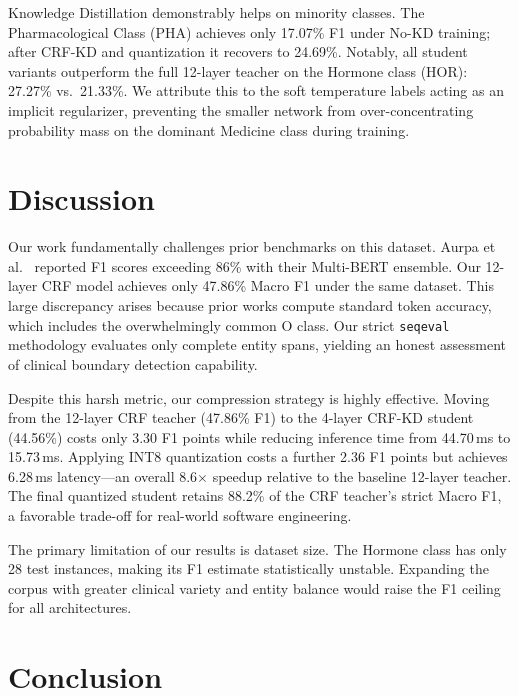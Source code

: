 \documentclass[conference]{IEEEtran}
\begin{document}
Knowledge Distillation demonstrably helps on minority classes. The Pharmacological Class (PHA) achieves only 17.07\% F1 under No-KD training; after CRF-KD and quantization it recovers to 24.69\%. Notably, all student variants outperform the full 12-layer teacher on the Hormone class (HOR): 27.27\% vs.\ 21.33\%. We attribute this to the soft temperature labels acting as an implicit regularizer, preventing the smaller network from over-concentrating probability mass on the dominant Medicine class during training.

\section{Discussion}

Our work fundamentally challenges prior benchmarks on this dataset. Aurpa et al.~\cite{b5} reported F1 scores exceeding 86\% with their Multi-BERT ensemble. Our 12-layer CRF model achieves only 47.86\% Macro F1 under the same dataset. This large discrepancy arises because prior works compute standard token accuracy, which includes the overwhelmingly common O class. Our strict \texttt{seqeval} methodology evaluates only complete entity spans, yielding an honest assessment of clinical boundary detection capability.

Despite this harsh metric, our compression strategy is highly effective. Moving from the 12-layer CRF teacher (47.86\% F1) to the 4-layer CRF-KD student (44.56\%) costs only 3.30 F1 points while reducing inference time from 44.70\,ms to 15.73\,ms. Applying INT8 quantization costs a further 2.36 F1 points but achieves 6.28\,ms latency---an overall 8.6$\times$ speedup relative to the baseline 12-layer teacher. The final quantized student retains 88.2\% of the CRF teacher's strict Macro F1, a favorable trade-off for real-world software engineering.

The primary limitation of our results is dataset size. The Hormone class has only 28 test instances, making its F1 estimate statistically unstable. Expanding the corpus with greater clinical variety and entity balance would raise the F1 ceiling for all architectures.

\section{Conclusion}
\end{document}
